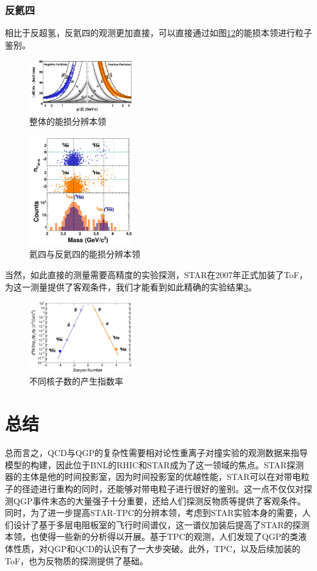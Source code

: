\documentclass[%
 reprint,
 amsmath,amssymb,
 aps,
]{revtex4-1}
\begin{document}
\subsubsection{\label{sec:antihelium4}反氦四}
相比于反超氢，反氦四的观测更加直接，可以直接通过如图\ref{fig:dEdxAll}\ref{fig:dEdxHe4}的能损本领进行粒子鉴别。
\begin{figure}[htbp]
    \includegraphics[width=0.4\textwidth]{Plots/dEdxAll.png}
    \caption{\label{fig:dEdxAll}整体的能损分辨本领}
\end{figure}
\begin{figure}[htbp]
    \includegraphics[width=0.4\textwidth]{Plots/dEdxHe4.png}
    \caption{\label{fig:dEdxHe4}氦四与反氦四的能损分辨本领}
\end{figure}
当然，如此直接的测量需要高精度的实验探测，STAR在2007年正式加装了ToF，为这一测量提供了客观条件，我们才能看到如此精确的实验结果\ref{fig:He4Yield}。
\begin{figure}
    \includegraphics[width=0.4\textwidth]{Plots/He4Yield.png}
    \caption{\label{fig:He4Yield}不同核子数的产生指数率}
\end{figure}

\section{\label{sec:Sum}总结}
总而言之，QCD与QGP的复杂性需要相对论性重离子对撞实验的观测数据来指导模型的构建，因此位于BNL的RHIC和STAR成为了这一领域的焦点。STAR探测器的主体是他的时间投影室，因为时间投影室的优越性能，STAR可以在对带电粒子的径迹进行重构的同时，还能够对带电粒子进行很好的鉴别。这一点不仅仅对探测QGP事件末态的大量强子十分重要，还给人们探测反物质等提供了客观条件。同时，为了进一步提高STAR-TPC的分辨本领，考虑到STAR实验本身的需要，人们设计了基于多层电阻板室的飞行时间谱仪，这一谱仪加装后提高了STAR的探测本领，也使得一些新的分析得以开展。基于TPC的观测，人们发现了QGP的类液体性质，对QGP和QCD的认识有了一大步突破。此外，TPC，以及后续加装的ToF，也为反物质的探测提供了基础。
\end{document}
